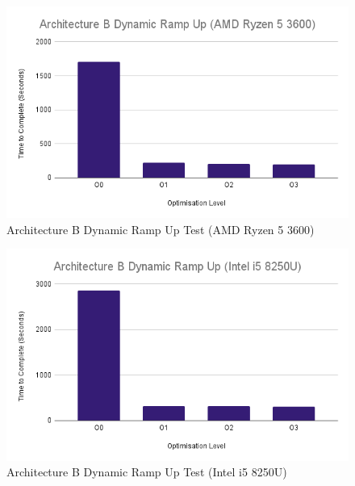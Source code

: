 \documentclass{article}
\begin{document}
\begin{figure}[!h]
\centering
\includegraphics[scale=0.5]{Architecture B Dynamic Ramp Up (AMD Ryzen 5 3600).png}
\caption{Architecture B Dynamic Ramp Up Test (AMD Ryzen 5 3600)}
\label{arch_b_dynamic_ramp_up_pc}
\end{figure}

\begin{figure}[!h]
\centering
\includegraphics[scale=0.5]{Architecture B Dynamic Ramp Up (Intel i5 8250U).png}
\caption{Architecture B Dynamic Ramp Up Test (Intel i5 8250U)}
\label{arch_b_dynamic_ramp_up_laptop}
\end{figure}

\clearpage
\end{document}
